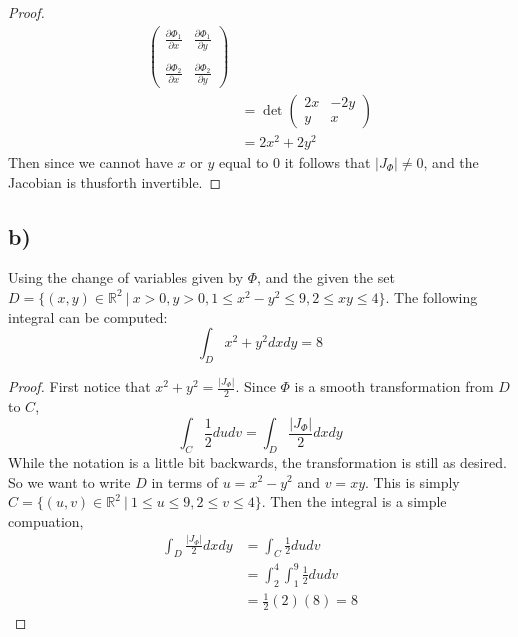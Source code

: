\documentclass{article}
\theoremstyle{definition}
\begin{document}
\begin{proof}
\begin{align*}
\begin{pmatrix}
        \frac{\partial \Phi_1}{\partial x} & \frac{\partial \Phi_1}{\partial y} \\\\
        \frac{\partial \Phi_2}{\partial x} & \frac{\partial \Phi_2}{\partial y}
    \end{pmatrix}\\
    &= \det \begin{pmatrix}
        2x & -2y\\
        y & x
    \end{pmatrix}\\
    &= 2x^2 + 2y^2
\end{align*}
Then since we cannot have $x$ or $y$ equal to 0 it follows that $|J_\Phi| \neq 0$, and the Jacobian is thusforth invertible.
\end{proof}
\subsection*{b)}
\begin{mdframed}[]
    Using the change of variables given by $\Phi$, and the given the set $D = \{(x,y) \in\mathbb{R}^2 \ | \ x>0,y>0, 1\leqslant x^2 -y^2 \leqslant 9, 2 \leqslant xy \leqslant 4\}$.
    The following integral can be computed:
    \[
        \int_Dx^2 + y^2 dxdy = 8  
    \]
\end{mdframed}
\begin{proof}
    First notice that $x^2 + y^2 = \frac{|J_\Phi|}{2}$. Since $\Phi$ is a smooth transformation from $D$ to $C$,
\[
    \int_C \frac{1}{2} dudv = \int_D \frac{|J_\Phi|}{2} dxdy
\]  
While the notation is a little bit backwards, the transformation is still as desired.
So we want to write $D$ in terms of $u = x^2 -y^2$ and $v = xy$. This is simply $C=\{(u,v)\in\mathbb{R}^2 \ | \ 1 \leqslant u \leqslant 9, 2\leqslant v \leqslant 4 \}$.
Then the integral is a simple compuation,
\begin{align*}
    \int_D \frac{|J_\Phi|}{2} dxdy &= \int_C \frac{1}{2} dudv\\
    &= \int_2^4\int_1^9 \frac{1}{2}dudv \\
    &= \frac{1}{2}(2)(8) = 8
\end{align*}
\end{proof}
\end{document}
